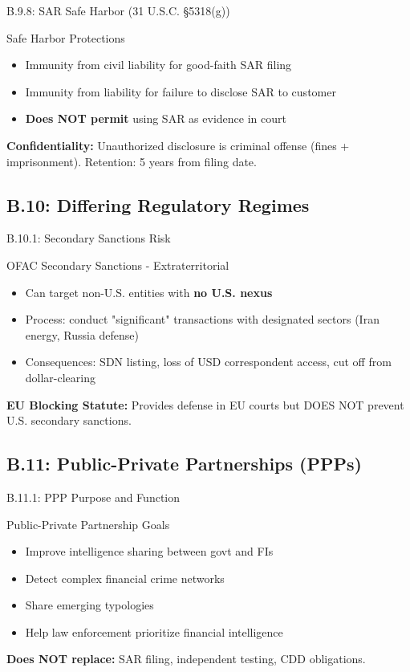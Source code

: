 \documentclass{beamer}
\begin{document}
	\begin{frame}{B.9.8: SAR Safe Harbor (31 U.S.C. §5318(g))}
		\begin{block}{Safe Harbor Protections}
			\begin{itemize}
				\item Immunity from civil liability for good-faith SAR filing
				\item Immunity from liability for failure to disclose SAR to customer
				\item \textbf{Does NOT permit} using SAR as evidence in court
			\end{itemize}
		\end{block}
		\textbf{Confidentiality:} Unauthorized disclosure is criminal offense (fines + imprisonment). Retention: 5 years from filing date.
	\end{frame}
	
	\subsection{B.10: Differing Regulatory Regimes}
	
	\begin{frame}{B.10.1: Secondary Sanctions Risk}
		\begin{block}{OFAC Secondary Sanctions - Extraterritorial}
			\begin{itemize}
				\item Can target non-U.S. entities with \textbf{no U.S. nexus}
				\item Process: conduct "significant" transactions with designated sectors (Iran energy, Russia defense)
				\item Consequences: SDN listing, loss of USD correspondent access, cut off from dollar-clearing
			\end{itemize}
		\end{block}
		\textbf{EU Blocking Statute:} Provides defense in EU courts but DOES NOT prevent U.S. secondary sanctions.
	\end{frame}
	
	\subsection{B.11: Public-Private Partnerships (PPPs)}
	
	\begin{frame}{B.11.1: PPP Purpose and Function}
		\begin{block}{Public-Private Partnership Goals}
			\begin{itemize}
				\item Improve intelligence sharing between govt and FIs
				\item Detect complex financial crime networks
				\item Share emerging typologies
				\item Help law enforcement prioritize financial intelligence
			\end{itemize}
		\end{block}
		\textbf{Does NOT replace:} SAR filing, independent testing, CDD obligations.
	\end{frame}
	
\end{document}
